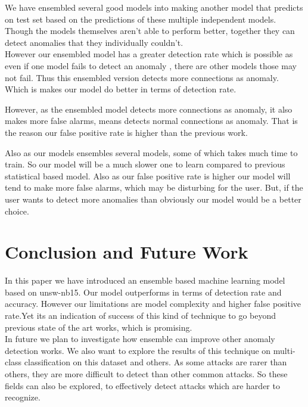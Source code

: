 \documentclass[14pt, conference]{IEEEtran}
\begin{document}
We have ensembled several good models into making another model that predicts on test set based on the predictions of these multiple independent models. Though the models themselves aren't able to perform better, together they can detect anomalies that they individually couldn't. \\

However our ensembled model has a greater detection rate which is possible as even if one model fails to detect an anomaly , there are other models those may not fail. Thus this ensembled version detects more connections as anomaly. Which is makes our model do better in terms of detection rate. 

However, as the ensembled model detects more connections as anomaly, it also makes more false alarms, means detects normal connections as anomaly. That is the reason our false positive rate is higher than the previous work.

Also as our models ensembles several models, some of which takes much time to train. So our model will be a much slower one to learn compared to previous statistical based model. Also as our false positive rate is higher our model will tend to make more false alarms, which may be disturbing for the user. But, if the user wants to detect more anomalies than obviously our model would be a better choice.





\section{Conclusion and Future Work}
In this paper we have introduced an ensemble based machine learning model based on unsw-nb15. Our model outperforms in terms of detection rate and accuracy. However our limitations are model complexity and higher false positive rate.Yet its an indication of success of this kind of technique to go beyond previous state of the art works, which is promising. \\
In future we plan to investigate how ensemble can improve other anomaly detection works. We also want to explore the results of this technique on multi-class classification on this dataset and others. As some attacks are rarer than others, they are more difficult to detect than other common attacks. So these fields can also be explored, to effectively detect attacks which are harder to recognize.



 
\end{document}
